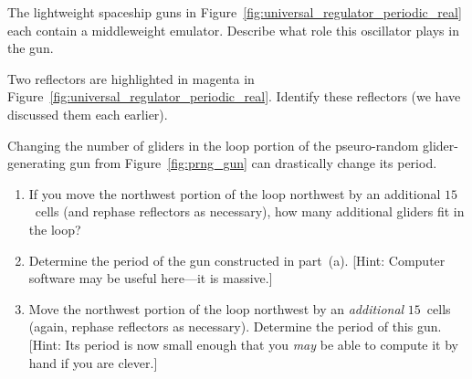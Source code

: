 \begin{multicols}{2}
	
	\mfilbreak
	
	
	\begin{problem}\label{exer:p60_regulator_mwss_emulator}
		The lightweight spaceship guns in Figure~\ref{fig:universal_regulator_periodic_real} each contain a middleweight emulator. Describe what role this oscillator plays in the gun.
	\end{problem}
	
	
	\mfilbreak
	
	
	\begin{problem}\label{exer:p60_regulator_reflectors}
		Two reflectors are highlighted in magenta in Figure~\ref{fig:universal_regulator_periodic_real}. Identify these reflectors (we have discussed them each earlier).
	\end{problem}
	
	
	\mfilbreak
	
	
	\begin{problem}\label{exer:prng_gun}
		Changing the number of gliders in the loop portion of the pseuro-random glider-generating gun from Figure~\ref{fig:prng_gun} can drastically change its period.\smallskip
		
		\begin{enumerate}[label=\bf\color{ocre}(\alph*)]
			\item If you move the northwest portion of the loop northwest by an additional $15$~cells (and rephase reflectors as necessary), how many additional gliders fit in the loop?
			
			\item Determine the period of the gun constructed in part~(a). [Hint: Computer software may be useful here---it is massive.]
			
			\item Move the northwest portion of the loop northwest by an \emph{additional} $15$~cells (again, rephase reflectors as necessary). Determine the period of this gun. [Hint: Its period is now small enough that you \emph{may} be able to compute it by hand if you are clever.]
		\end{enumerate}
	\end{problem}
	
	
	
	

\end{multicols}
